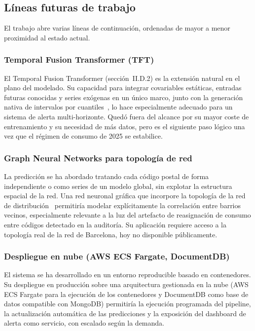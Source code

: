 \documentclass[12pt, a4paper]{article}
\begin{document}
\subsection{Líneas futuras de trabajo}

El trabajo abre varias líneas de continuación, ordenadas de mayor a menor proximidad al estado actual.

\subsubsection{Temporal Fusion Transformer (TFT)}

El Temporal Fusion Transformer (sección~II.D.2) es la extensión natural en el plano del modelado. Su capacidad para integrar covariables estáticas, entradas futuras conocidas y series exógenas en un único marco, junto con la generación nativa de intervalos por cuantiles~\cite{lim2021}, lo hace especialmente adecuado para un sistema de alerta multi-horizonte. Quedó fuera del alcance por su mayor coste de entrenamiento y su necesidad de más datos, pero es el siguiente paso lógico una vez que el régimen de consumo de 2025 se estabilice.

\subsubsection{Graph Neural Networks para topología de red}

La predicción se ha abordado tratando cada código postal de forma independiente o como series de un modelo global, sin explotar la estructura espacial de la red. Una red neuronal gráfica que incorpore la topología de la red de distribución~\cite{suri2025} permitiría modelar explícitamente la correlación entre barrios vecinos, especialmente relevante a la luz del artefacto de reasignación de consumo entre códigos detectado en la auditoría. Su aplicación requiere acceso a la topología real de la red de Barcelona, hoy no disponible públicamente.

\subsubsection{Despliegue en nube (AWS ECS Fargate, DocumentDB)}

El sistema se ha desarrollado en un entorno reproducible basado en contenedores. Su despliegue en producción sobre una arquitectura gestionada en la nube (AWS ECS Fargate para la ejecución de los contenedores y DocumentDB como base de datos compatible con MongoDB) permitiría la ejecución programada del pipeline, la actualización automática de las predicciones y la exposición del dashboard de alerta como servicio, con escalado según la demanda.
\end{document}
